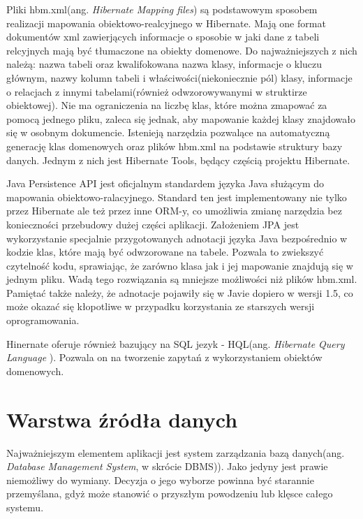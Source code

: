 Pliki hbm.xml(ang. \textit{Hibernate Mapping files}) są podstawowym sposobem realizacji mapowania obiektowo-realcyjnego w Hibernate. Mają one format dokumentów xml zawierjących informacje o sposobie w jaki dane z tabeli relcyjnych mają być tłumaczone na obiekty domenowe. Do najważniejszych z nich należą: nazwa tabeli oraz kwalifokowana nazwa klasy, informacje o kluczu głównym, nazwy kolumn tabeli i właściwości(niekoniecznie pól) klasy, informacje o relacjach z innymi tabelami(również odwzorowywanymi w struktirze obiektowej). Nie ma ograniczenia na liczbę klas, które można zmapować za pomocą jednego pliku, zaleca się jednak, aby mapowanie każdej klasy znajdowało się w osobnym dokumencie. Istenieją narzędzia pozwalące na automatyczną generację klas domenowych oraz plików hbm.xml na podstawie struktury bazy danych. Jednym z nich jest Hibernate Tools, będący częścią projektu Hibernate.

Java Persistence API jest oficjalnym standardem języka Java służącym do mapowania obiektowo-ralacyjnego. Standard ten jest implementowany nie tylko przez Hibernate ale też przez inne ORM-y, co umożliwia zmianę narzędzia bez konieczności przebudowy dużej części aplikacji. Założeniem JPA jest wykorzystanie specjalnie przygotowanych adnotacji języka Java bezpośrednio w kodzie klas, które mają być odwzorowane na tabele. Pozwala to zwiekszyć czytelność kodu, sprawiając, że zarówno klasa jak i jej mapowanie znajdują się w jednym pliku. Wadą tego rozwiązania są mniejsze możliwości niż plików hbm.xml. Pamiętać także należy, że adnotacje pojawiły się w Javie dopiero w wersji 1.5, co może okazać się kłopotliwe w przypadku korzystania ze starszych wersji oprogramowania.

Hinernate oferuje również bazujący na SQL jezyk - HQL(ang. \textit{Hibernate Query Language }). Pozwala on na tworzenie zapytań z wykorzystaniem obiektów domenowych.

\section[Warstwa źródła danych][Warstwa źródła danych]{Warstwa źródła danych}
Najważniejszym elementem aplikacji jest system zarządzania bazą danych(ang. \textit{Database Management System}, w skrócie DBMS)). Jako jedyny jest prawie niemożliwy do wymiany. Decyzja o jego wyborze powinna być starannie przemyślana, gdyż może stanowić o przyszłym powodzeniu lub klęsce całego systemu.

